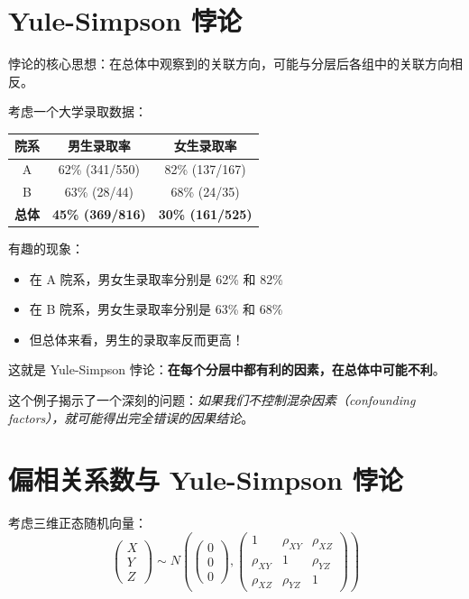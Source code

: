 \section{Yule-Simpson 悖论}

悖论的核心思想：在总体中观察到的关联方向，可能与分层后各组中的关联方向相反。

\begin{Example}
考虑一个大学录取数据：

\begin{center}
\begin{tabular}{c|c|c}
\hline
院系 & 男生录取率 & 女生录取率 \\
\hline
A & 62\% (341/550) & 82\% (137/167) \\
B & 63\% (28/44) & 68\% (24/35) \\
\hline
\textbf{总体} & \textbf{45\% (369/816)} & \textbf{30\% (161/525)} \\
\hline
\end{tabular}
\end{center}

有趣的现象：
\begin{itemize}
  \item 在 A 院系，男女生录取率分别是 62\% 和 82\%
  \item 在 B 院系，男女生录取率分别是 63\% 和 68\%
  \item 但总体来看，男生的录取率反而更高！
\end{itemize}

这就是 Yule-Simpson 悖论：\textbf{在每个分层中都有利的因素，在总体中可能不利}。
\end{Example}

这个例子揭示了一个深刻的问题：\textit{如果我们不控制混杂因素（confounding factors），就可能得出完全错误的因果结论}。

\section{偏相关系数与 Yule-Simpson 悖论}

考虑三维正态随机向量：
\[
\begin{pmatrix}
X \\ Y \\ Z
\end{pmatrix}
\sim N\left(
\begin{pmatrix}
0 \\ 0 \\ 0
\end{pmatrix},
\begin{pmatrix}
1 & \rho_{XY} & \rho_{XZ} \\
\rho_{XY} & 1 & \rho_{YZ} \\
\rho_{XZ} & \rho_{YZ} & 1
\end{pmatrix}
\right)
\]

